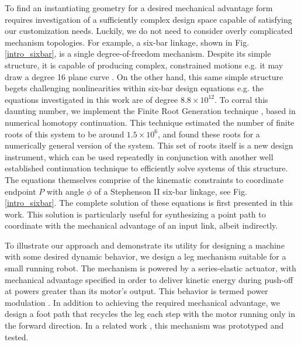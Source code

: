 \documentclass[journal]{IEEEtran}
\begin{document}
To find an instantiating geometry for a desired mechanical advantage form requires investigation of a sufficiently complex design space capable of satisfying our customization needs.
Luckily, we do not need to consider overly complicated mechanism topologies.
For example, a six-bar linkage, shown in Fig. \ref{intro_sixbar}, is a single degree-of-freedom mechanism.
Despite its simple structure, it is capable of producing complex, constrained motions e.g. it may draw a degree 16 plane curve \cite{primroseSixbarMotionII1967}.
On the other hand, this same simple structure begets challenging nonlinearities within six-bar design equations e.g. the equations investigated in this work are of degree $8.8 \times 10^{12}$.
To corral this daunting number, we implement the Finite Root Generation technique \cite{plecnikFindingOnlyFinite2017}, based in numerical homotopy continuation.
This technique estimated the number of finite roots of this system to be around $1.5 \times 10^6$, and found these roots for a numerically general version of the system.
This set of roots itself is a new design instrument, which can be used repeatedly in conjunction with another well established continuation technique \cite{morganCoefficientparameterPolynomialContinuation1989} to efficiently solve systems of this structure.
The equations themselves comprise of the kinematic constraints to coordinate endpoint $P$ with angle $\phi$ of a Stephenson II six-bar linkage, see Fig. \ref{intro_sixbar}.
The complete solution of these equations is first presented in this work.
This solution is particularly useful for synthesizing a point path to coordinate with the mechanical advantage of an input link, albeit indirectly.


To illustrate our approach and demonstrate its utility for designing a machine with some desired dynamic behavior, 
we design a leg mechanism suitable for a small running robot.
The mechanism is powered by a series-elastic actuator, with mechanical advantage specified in order to deliver kinetic energy during push-off at powers greater than its motor's output.
This behavior is termed power modulation \cite{haldaneRoboticVerticalJumping2016}.
In addition to achieving the required mechanical advantage, we design a foot path that recycles the leg each step with the motor running only in the forward direction.
In a related work \cite{plecnikAdjustablePowerModulation2019}, this mechanism was prototyped and tested.
\end{document}
